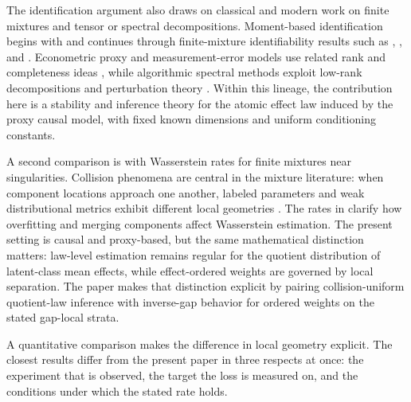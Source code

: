 The identification argument also draws on classical and modern work on finite mixtures and tensor or spectral decompositions. Moment-based identification begins with \citet{Pearson1894} and continues through finite-mixture identifiability results such as \citet{Teicher1963}, \citet{Lindsay1995}, and \citet{AllmanMatiasRhodes2009}. Econometric proxy and measurement-error models use related rank and completeness ideas \citep{Hu2008,HuSchennach2008,KasaharaShimotsu2009,BonhommeJochmansRobin2016}, while algorithmic spectral methods exploit low-rank decompositions and perturbation theory \citep{HsuKakadeZhang2009,Anandkumar2014,SidiropoulosBro2000,BauerFike1960,Kato1995,DavisKahan1970,StewartSun1990,MazaheriSquiresUhler2025}. Within this lineage, the contribution here is a stability and inference theory for the atomic effect law induced by the proxy causal model, with fixed known dimensions and uniform conditioning constants.

A second comparison is with Wasserstein rates for finite mixtures near singularities. Collision phenomena are central in the mixture literature: when component locations approach one another, labeled parameters and weak distributional metrics exhibit different local geometries \citep{Nguyen2013,HoNguyenWeak2016,HeinrichKahn2018,HoNguyen2016,ManoleHo2022,NguyenLeRinaldoHo2026}. The rates in \citet{HeinrichKahn2018} clarify how overfitting and merging components affect Wasserstein estimation. The present setting is causal and proxy-based, but the same mathematical distinction matters: law-level estimation remains regular for the quotient distribution of latent-class mean effects, while effect-ordered weights are governed by local separation. The paper makes that distinction explicit by pairing collision-uniform quotient-law inference with inverse-gap behavior for ordered weights on the stated gap-local strata.

A quantitative comparison makes the difference in local geometry explicit. The closest results differ from the present paper in three respects at once: the experiment that is observed, the target the loss is measured on, and the conditions under which the stated rate holds.


